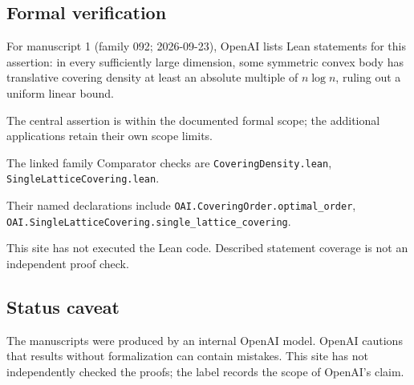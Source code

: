 \documentclass[11pt]{article}
\begin{document}
\subsection{Formal verification}
For manuscript 1 (family 092; 2026-09-23), OpenAI lists Lean statements for this assertion: in every sufficiently large dimension, some symmetric convex body has translative covering density at least an absolute multiple of $n\log n$, ruling out a uniform linear bound.

The central assertion is within the documented formal scope; the additional applications retain their own scope limits.

The linked family Comparator checks are \texttt{CoveringDensity.lean}, \texttt{SingleLatticeCovering.lean}.

Their named declarations include \texttt{OAI.CoveringOrder.optimal\_order}, \texttt{OAI.SingleLatticeCovering.single\_lattice\_covering}.

This site has not executed the Lean code. Described statement coverage is not an independent proof check.

\subsection{Status caveat}
The manuscripts were produced by an internal OpenAI model. OpenAI cautions that results without formalization can contain mistakes. This site has not independently checked the proofs; the label records the scope of OpenAI's claim.
\end{document}
